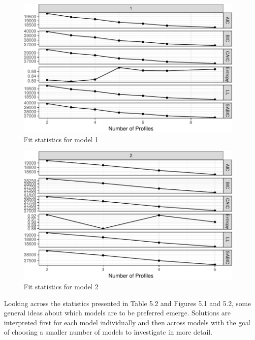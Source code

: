 \documentclass[]{book}
\theoremstyle{definition}
\theoremstyle{definition}
\theoremstyle{definition}
\theoremstyle{remark}
\begin{document}
\begin{figure}

{\centering \includegraphics[width=0.6\linewidth]{rosenberg-dissertation_files/figure-latex/model1-1} 

}

\caption{Fit statistics for model 1}\label{fig:model1}
\end{figure}

\begin{figure}

{\centering \includegraphics[width=0.5\linewidth]{rosenberg-dissertation_files/figure-latex/model2-1} 

}

\caption{Fit statistics for model 2}\label{fig:model2}
\end{figure}

Looking across the statistics presented in Table 5.2 and Figures 5.1 and
5.2, some general ideas about which models are to be preferred emerge.
Solutions are interpreted first for each model individually and then
across models with the goal of choosing a smaller number of models to
investigate in more detail.
\end{document}

